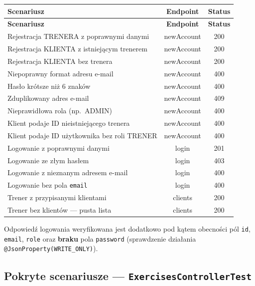 \documentclass[12pt,a4paper]{article}
\begin{document}
\begin{center}
\begin{longtable}{p{7.5cm}cc}
  \toprule
  \textbf{Scenariusz} & \textbf{Endpoint} & \textbf{Status} \\
  \midrule
  \endfirsthead
  \toprule
  \textbf{Scenariusz} & \textbf{Endpoint} & \textbf{Status} \\
  \midrule
  \endhead
  Rejestracja TRENERA z poprawnymi danymi            & newAccount & 200 \\
  Rejestracja KLIENTA z istniejącym trenerem         & newAccount & 200 \\
  Rejestracja KLIENTA bez trenera                    & newAccount & 200 \\
  Niepoprawny format adresu e-mail                   & newAccount & 400 \\
  Hasło krótsze niż 6 znaków                         & newAccount & 400 \\
  Zduplikowany adres e-mail                          & newAccount & 409 \\
  Nieprawidłowa rola (np.\ ADMIN)                    & newAccount & 400 \\
  Klient podaje ID nieistniejącego trenera            & newAccount & 400 \\
  Klient podaje ID użytkownika bez roli TRENER       & newAccount & 400 \\
  Logowanie z poprawnymi danymi                      & login      & 201 \\
  Logowanie ze złym hasłem                           & login      & 403 \\
  Logowanie z nieznanym adresem e-mail               & login      & 400 \\
  Logowanie bez pola \texttt{email}                  & login      & 400 \\
  Trener z przypisanymi klientami                    & clients    & 200 \\
  Trener bez klientów --- pusta lista                & clients    & 200 \\
  \bottomrule
\end{longtable}
\end{center}

Odpowiedź logowania weryfikowana jest dodatkowo pod kątem obecności pól \texttt{id},
\texttt{email}, \texttt{role} oraz \textbf{braku} pola \texttt{password} (sprawdzenie
działania \texttt{@JsonProperty(WRITE\_ONLY)}).

\subsection{Pokryte scenariusze --- \texttt{ExercisesControllerTest}}
\end{document}
